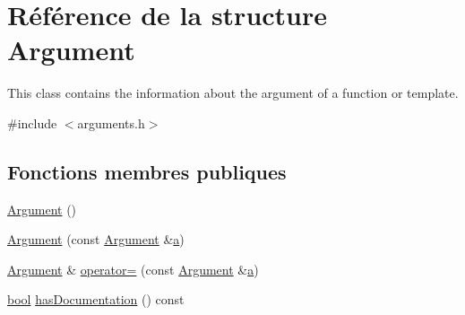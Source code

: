 \hypertarget{struct_argument}{}\section{Référence de la structure Argument}
\label{struct_argument}


This class contains the information about the argument of a function or template.  




{\ttfamily \#include $<$arguments.\+h$>$}

\subsection*{Fonctions membres publiques}
\begin{DoxyCompactItemize}
\item 
\hyperlink{struct_argument_a21f78c9b347967aa8bf77e5d3f35592f}{Argument} ()
\item 
\hyperlink{struct_argument_a87adc78036a4e04a05692bd13f90d91a}{Argument} (const \hyperlink{struct_argument}{Argument} \&\hyperlink{060__command__switch_8tcl_ab08ae027fc5777bc4f0629f1b60b35db}{a})
\item 
\hyperlink{struct_argument}{Argument} \& \hyperlink{struct_argument_aeb2dc827f4c8a7f597f714b3995c20e4}{operator=} (const \hyperlink{struct_argument}{Argument} \&\hyperlink{060__command__switch_8tcl_ab08ae027fc5777bc4f0629f1b60b35db}{a})
\item 
\hyperlink{qglobal_8h_a1062901a7428fdd9c7f180f5e01ea056}{bool} \hyperlink{struct_argument_a3f0aa4b21a40b3d36e6cf645504cf60b}{has\+Documentation} () const 
\end{DoxyCompactItemize}
